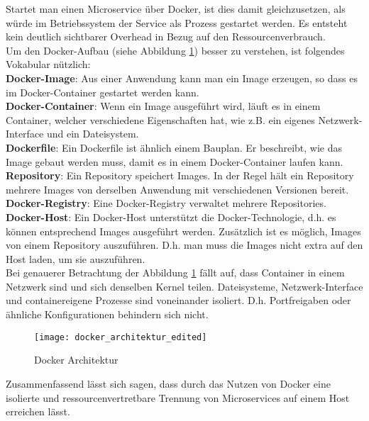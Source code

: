 Startet man einen Microservice über Docker, ist dies damit gleichzusetzen, als würde im Betriebssystem der Service als Prozess gestartet werden. Es entsteht kein deutlich sichtbarer Overhead in Bezug auf den Ressourcenverbrauch.\cite{wolff2016mic_architectures} \\

Um den Docker-Aufbau (siehe Abbildung \ref{fig:docker_architektur_edited}) besser zu verstehen, ist folgendes Vokabular nützlich:\cite{wolff2016mic_architectures} \\

\textbf{Docker-Image}: Aus einer Anwendung kann man ein Image erzeugen, so dass es im Docker-Container gestartet werden kann.  \\

\textbf{Docker-Container}: Wenn ein Image ausgeführt wird, läuft es in einem Container, welcher verschiedene Eigenschaften hat, wie z.B. ein eigenes Netzwerk-Interface und ein Dateisystem.\\

\textbf{Dockerfile}: Ein Dockerfile ist ähnlich einem Bauplan. Er beschreibt, wie das Image gebaut werden muss, damit es in einem Docker-Container laufen kann. \\

\textbf{Repository}: Ein Repository speichert Images. In der Regel hält ein Repository mehrere Images von derselben Anwendung mit verschiedenen Versionen bereit.\cite{RedHat} \\

\textbf{Docker-Registry}: Eine Docker-Registry verwaltet mehrere Repositories. \\

\textbf{Docker-Host}: Ein Docker-Host unterstützt die Docker-Technologie, d.h. es können entsprechend Images ausgeführt werden. Zusätzlich ist es möglich, Images von einem Repository auszuführen. D.h. man muss die Images nicht extra auf den Host laden, um sie auszuführen. \\

Bei genauerer Betrachtung der Abbildung \ref{fig:docker_architektur_edited} fällt auf, dass Container in einem Netzwerk sind und sich denselben Kernel teilen. Dateisysteme, Netzwerk-Interface und containereigene Prozesse sind voneinander isoliert. D.h. Portfreigaben oder ähnliche Konfigurationen behindern sich nicht. \\

\begin{figure}[H]
	\centering
	\texttt{[image: docker\_architektur\_edited]}
	\caption[Docker Architektur] { Docker Architektur\cite{wolff2016mic_architectures} }
	\label{fig:docker_architektur_edited}
\end{figure}

Zusammenfassend lässt sich sagen, dass durch das Nutzen von Docker eine isolierte und ressourcenvertretbare Trennung von Microservices auf einem Host erreichen lässt. \\

